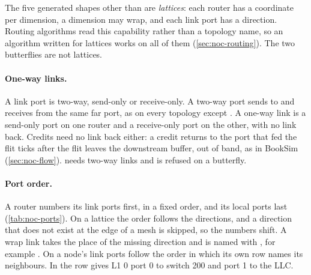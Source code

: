 The five generated shapes other than  are \emph{lattices}: each router has a coordinate
per dimension, a dimension may wrap, and each link port has a direction. Routing algorithms read
this capability rather than a topology name, so an algorithm written for lattices works on all of
them (\cref{sec:noc-routing}). The two butterflies are not lattices.

\paragraph{One-way links.} A link port is two-way, send-only or receive-only. A two-way port
sends to and receives from the same far port, as on every topology except . A
one-way link is a send-only port on one router and a receive-only port on the other, with no link
back. Credits need no link back either: a credit returns to the port that fed the flit
 ticks after the flit leaves the downstream buffer, out of band, as in
BookSim (\cref{sec:noc-flow}).  needs two-way links and is refused on a
butterfly.

\paragraph{Port order.} A router numbers its link ports first, in a fixed order, and its local
ports last (\cref{tab:noc-ports}). On a lattice the order follows the directions, and a direction
that does not exist at the edge of a mesh is skipped, so the numbers shift. A wrap link takes the
place of the missing direction and is named with , for example . On
 a node's link ports follow the order in which its own row names its neighbours. In
 the row  gives L1 0 port 0 to switch 200 and port 1
to the LLC.

